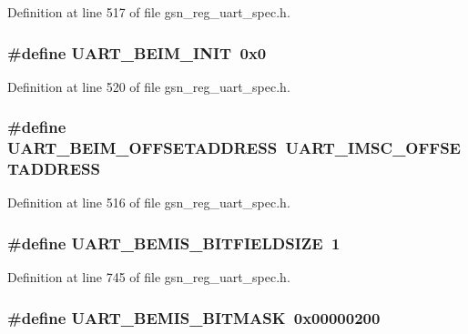 Definition at line 517 of file gsn\_\-reg\_\-uart\_\-spec.h.

\hypertarget{a00575_a0d8fc4f45d9d6b428d36ea363432e84b}{
\subsubsection[{UART\_\-BEIM\_\-INIT}]{\setlength{\rightskip}{0pt plus 5cm}\#define UART\_\-BEIM\_\-INIT~0x0}}
\label{a00575_a0d8fc4f45d9d6b428d36ea363432e84b}


Definition at line 520 of file gsn\_\-reg\_\-uart\_\-spec.h.

\hypertarget{a00575_a119295c6a08a5cf192290fa1c84b8647}{
\subsubsection[{UART\_\-BEIM\_\-OFFSETADDRESS}]{\setlength{\rightskip}{0pt plus 5cm}\#define UART\_\-BEIM\_\-OFFSETADDRESS~UART\_\-IMSC\_\-OFFSETADDRESS}}
\label{a00575_a119295c6a08a5cf192290fa1c84b8647}


Definition at line 516 of file gsn\_\-reg\_\-uart\_\-spec.h.

\hypertarget{a00575_a55f9594f11a7cb606fae22ca0eff2d71}{
\subsubsection[{UART\_\-BEMIS\_\-BITFIELDSIZE}]{\setlength{\rightskip}{0pt plus 5cm}\#define UART\_\-BEMIS\_\-BITFIELDSIZE~1}}
\label{a00575_a55f9594f11a7cb606fae22ca0eff2d71}


Definition at line 745 of file gsn\_\-reg\_\-uart\_\-spec.h.

\hypertarget{a00575_a5025e843e5b7edac1305bc6a9abaca6f}{
\subsubsection[{UART\_\-BEMIS\_\-BITMASK}]{\setlength{\rightskip}{0pt plus 5cm}\#define UART\_\-BEMIS\_\-BITMASK~0x00000200}}
\label{a00575_a5025e843e5b7edac1305bc6a9abaca6f}


